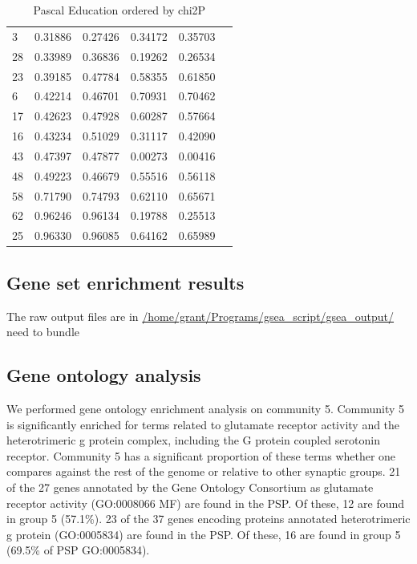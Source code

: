 \begin{table}[ht]
\begin{tabular}{llllll}
  3 & 0.31886 & 0.27426 & 0.34172 & 0.35703 \\ 
  28 & 0.33989 & 0.36836 & 0.19262 & 0.26534 \\ 
  23 & 0.39185 & 0.47784 & 0.58355 & 0.61850 \\ 
  6 & 0.42214 & 0.46701 & 0.70931 & 0.70462 \\ 
  17 & 0.42623 & 0.47928 & 0.60287 & 0.57664 \\ 
  16 & 0.43234 & 0.51029 & 0.31117 & 0.42090 \\ 
  43 & 0.47397 & 0.47877 & 0.00273 & 0.00416 \\ 
  48 & 0.49223 & 0.46679 & 0.55516 & 0.56118 \\ 
  58 & 0.71790 & 0.74793 & 0.62110 & 0.65671 \\ 
  62 & 0.96246 & 0.96134 & 0.19788 & 0.25513 \\ 
  25 & 0.96330 & 0.96085 & 0.64162 & 0.65989 \\ 
   \bottomrule
\end{tabular}
\caption{Pascal Education ordered by chi2P} 
\label{tab:Pascal Education ordered by chi2P}
\end{table}
\clearpage

\clearpage
\subsection{Gene set enrichment results}

The raw output files are in \url{/home/grant/Programs/gsea_script/gsea_output/} need to bundle
\subsection{Gene ontology analysis}
\label{sec: spectral group 5 analysis}
We performed gene ontology enrichment analysis on community  5. Community 5 is significantly enriched for terms related to glutamate receptor activity and the heterotrimeric g protein complex, including the G protein coupled serotonin receptor. Community 5 has a significant proportion of these terms whether one compares against the rest of the genome or relative to other synaptic groups. 21 of the 27 genes annotated by the Gene Ontology Consortium as
glutamate receptor activity (GO:0008066 MF) are found in the PSP. Of these, 12 are found in group 5 (57.1\%). 
23 of the 37 genes encoding proteins annotated heterotrimeric g protein (GO:0005834) are found in the PSP. Of these, 16 are found in group 5 (69.5\% of PSP GO:0005834). 

